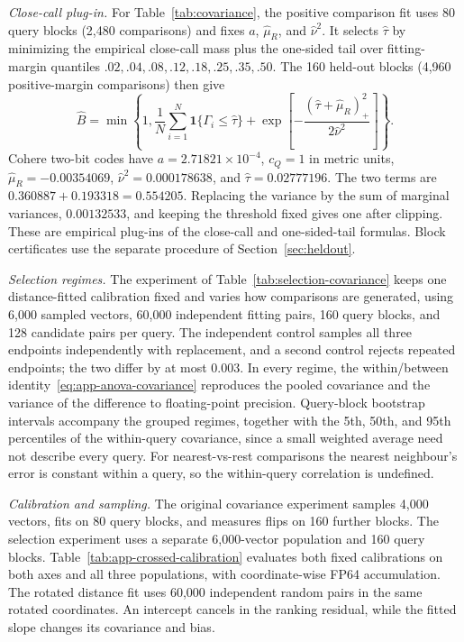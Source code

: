 \noindent\emph{Close-call plug-in.}\quad
For Table~\ref{tab:covariance}, the positive comparison fit uses 80 query blocks (2{,}480 comparisons) and fixes $a$, $\widehat\mu_R$, and $\widehat\nu^2$. It selects $\widehat\tau$ by minimizing the empirical close-call mass plus the one-sided tail over fitting-margin quantiles $.02,.04,.08,.12,.18,.25,.35,.50$. The 160 held-out blocks (4{,}960 positive-margin comparisons) then give
\begin{equation}
\widehat B=\min\!\left\{1,\frac1N\sum_{i=1}^N\mathbf1\{\Gamma_i\le\widehat\tau\}
+\exp\!\left[-\frac{(\widehat\tau+\widehat\mu_R)_+^2}{2\widehat\nu^2}\right]\right\}.
\label{eq:app-covariance-plugin}
\end{equation}
Cohere two-bit codes have $a=2.71821\times10^{-4}$, $c_Q=1$ in metric units, $\widehat\mu_R=-0.00354069$, $\widehat\nu^2=0.000178638$, and $\widehat\tau=0.02777196$. The two terms are $0.360887+0.193318=0.554205$. Replacing the variance by the sum of marginal variances, $0.00132533$, and keeping the threshold fixed gives one after clipping. These are empirical plug-ins of the close-call and one-sided-tail formulas. Block certificates use the separate procedure of Section~\ref{sec:heldout}.

\noindent\emph{Selection regimes.}\quad
The experiment of Table~\ref{tab:selection-covariance} keeps one distance-fitted calibration fixed and varies how comparisons are generated, using 6{,}000 sampled vectors, 60{,}000 independent fitting pairs, 160 query blocks, and 128 candidate pairs per query. The independent control samples all three endpoints independently with replacement, and a second control rejects repeated endpoints; the two differ by at most 0.003. In every regime, the within/between identity~\eqref{eq:app-anova-covariance} reproduces the pooled covariance and the variance of the difference to floating-point precision. Query-block bootstrap intervals accompany the grouped regimes, together with the 5th, 50th, and 95th percentiles of the within-query covariance, since a small weighted average need not describe every query. For nearest-vs-rest comparisons the nearest neighbour's error is constant within a query, so the within-query correlation is undefined.

\noindent\emph{Calibration and sampling.}\quad
The original covariance experiment samples 4{,}000 vectors, fits on 80 query blocks, and measures flips on 160 further blocks. The selection experiment uses a separate 6{,}000-vector population and 160 query blocks. Table~\ref{tab:app-crossed-calibration} evaluates both fixed calibrations on both axes and all three populations, with coordinate-wise FP64 accumulation. The rotated distance fit uses 60{,}000 independent random pairs in the same rotated coordinates. An intercept cancels in the ranking residual, while the fitted slope changes its covariance and bias.

